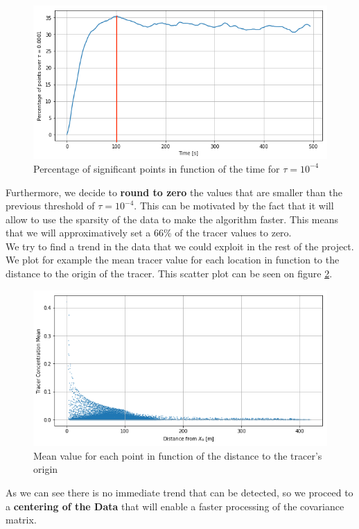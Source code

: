 \begin{figure}[]
\centering
	\includegraphics[width = 0.7 \textwidth]{figures/DataAnalysis/SumDataTime}
	\caption{Percentage of significant points in function of the time for $\tau = 10^{-4}$}
	\label{fig:sumtime}
\end{figure}


Furthermore, we decide to \textbf{round to zero} the values that are smaller than the previous threshold of $\tau = 10^{-4}$. This can be motivated by the fact that it will allow to use the sparsity of the data to make the algorithm faster. This means that we will approximatively set a 66\% of the tracer values to zero.\\

We try to find a trend in the data that we could exploit in the rest of the project. We plot for example the mean tracer value for each location in function to the distance to the origin of the tracer. This scatter plot can be seen on figure \ref{fig:tracerdistance}. 

\begin{figure}[]
\centering
	\includegraphics[width = 0.7 \textwidth]{figures/DataAnalysis/TracerMeanDistance}
	\caption{Mean value for each point in function of the distance to the tracer's origin}
	\label{fig:tracerdistance}
\end{figure}


As we can see there is no immediate trend that can be detected, so we proceed to a \textbf{centering of the Data} that will enable a faster processing of the covariance matrix. 












